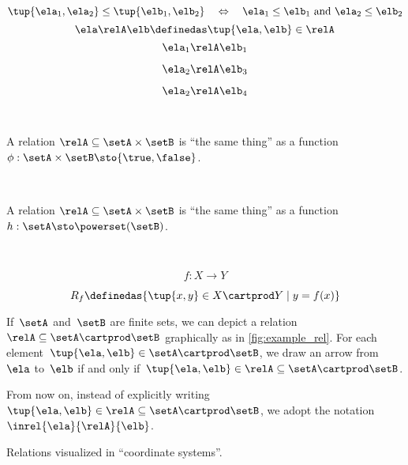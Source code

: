 {\begin{forslides}
        $$ \tup{\ela_1, \ela_2} \leq \tup{\elb_1, \elb_2} \quad \Leftrightarrow \quad \ela_1 \leq \elb_1 \text{ and } \ela_2 \leq \elb_2 \label{eq:slides-14}$$
        \begin{equation}
            \ela \relA \elb \definedas \tup{\ela, \elb} \in \relA  \label{eq:slides-15}
        \end{equation}
        $$ \ela_1 \relA \elb_1 \label{eq:slides-16}$$
        
        $$ \ela_2 \relA \elb_3 \label{eq:slides-17}$$
        
        $$ \ela_2 \relA \elb_4 \label{eq:slides-18}$$
        
        \
        
        A relation $\relA \subseteq \setA \times \setB$ is ``the same thing'' as a function $\phi : \setA \times \setB \sto \{\true, \false\}$.
        
        \
        
        
        A relation $\relA \subseteq \setA \times \setB$ is ``the same thing'' as a function $h : \setA  \sto \powerset (\setB)$.
        
        \
        
        $$
        f : X \to Y
        $$
        
        
        $$
        R_f \definedas \{ \tup{x, y} \in X \cartprod Y \mid y = f(x) \}
        $$
    
    \end{forslides}
}


\begin{marginfigure}
    \centering
    \caption{}
    \label{fig:example_rel}
\end{marginfigure}

If~$\setA$ and~$\setB$ are finite sets, we can depict a relation~$\relA \subseteq \setA \cartprod \setB$ graphically as in \cref{fig:example_rel}.
For each element~$\tup{\ela,\elb} \in \setA \cartprod \setB$, we draw an arrow from~$\ela$ to~$\elb$ if and only if~$\tup{\ela,\elb} \in \relA \subseteq \setA \cartprod \setB$.
\begin{remark}
    From now on, instead of explicitly writing~$\tup{\ela,\elb}\in \relA\subseteq \setA\cartprod \setB$, we adopt the notation~$\inrel{\ela}{\relA}{\elb}$.
\end{remark}


\begin{marginfigure}
    \centering
    \caption{Relations visualized in ``coordinate systems''.}
    \label{fig:example_rel_coord}
\end{marginfigure}

